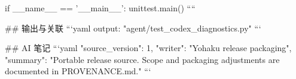 if __name__ == '__main__':
    unittest.main()
````

## 输出与关联
```yaml
output: "agent/test_codex_diagnostics.py"
```

## AI 笔记
```yaml
{"source_version": 1, "writer": "Yohaku release packaging", "summary": "Portable release source. Scope and packaging adjustments are documented in PROVENANCE.md."}
```
